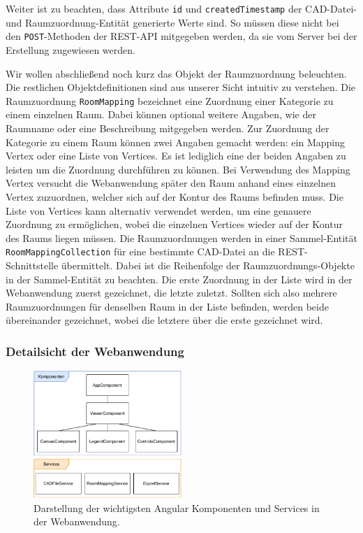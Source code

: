 Weiter ist zu beachten, dass Attribute \texttt{id} und \texttt{createdTimestamp} der CAD-Datei- und Raumzuordnung-Entität generierte Werte sind.
So müssen diese nicht bei den \texttt{POST}-Methoden der REST-API mitgegeben werden, da sie vom Server bei der Erstellung zugewiesen werden.

Wir wollen abschließend noch kurz das Objekt der Raumzuordnung beleuchten.
Die restlichen Objektdefinitionen sind aus unserer Sicht intuitiv zu verstehen.
Die Raumzuordnung \texttt{RoomMapping} bezeichnet eine Zuordnung einer Kategorie zu einem einzelnen Raum.
Dabei können optional weitere Angaben, wie der Raumname oder eine Beschreibung mitgegeben werden.
Zur Zuordnung der Kategorie zu einem Raum können zwei Angaben gemacht werden: ein Mapping Vertex oder eine Liste von Vertices.
Es ist lediglich eine der beiden Angaben zu leisten um die Zuordnung durchführen zu können.
Bei Verwendung des Mapping Vertex versucht die Webanwendung später den Raum anhand eines einzelnen Vertex zuzuordnen, welcher sich auf der Kontur des Raums befinden muss.
Die Liste von Vertices kann alternativ verwendet werden, um eine genauere Zuordnung zu ermöglichen, wobei die einzelnen Vertices wieder auf der Kontur des Raums liegen müssen.
Die Raumzuordnungen werden in einer Sammel-Entität \texttt{RoomMappingCollection} für eine bestimmte CAD-Datei an die REST-Schnittstelle übermittelt.
Dabei ist die Reihenfolge der Raumzuordnungs-Objekte in der Sammel-Entität zu beachten.
Die erste Zuordnung in der Liste wird in der Webanwendung zuerst gezeichnet, die letzte zuletzt.
Sollten sich also mehrere Raumzuordnungen für denselben Raum in der Liste befinden, werden beide übereinander gezeichnet, wobei die letztere über die erste gezeichnet wird.

\subsubsection{Detailsicht der Webanwendung}
\label{subsubsec:detail-webapp}

\begin{figure}
    \includegraphics[width=0.5\textwidth]{res/frontend.pdf}
    \caption{Darstellung der wichtigsten Angular Komponenten und Services in der Webanwendung.}
    \label{fig:angular-components}
\end{figure}

